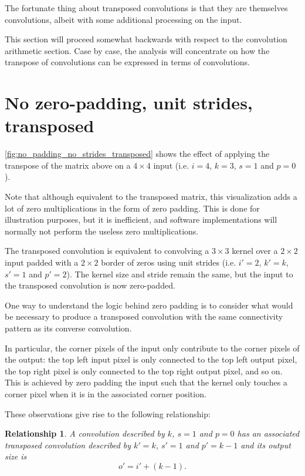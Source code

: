\documentclass{report}
\newtheorem{relationship}{Relationship}
\begin{document}
The fortunate thing about transposed convolutions is that they are themselves
convolutions, albeit with some additional processing on the input.

This section will proceed somewhat backwards with respect to the convolution
arithmetic section. Case by case, the analysis will concentrate on how the
transpose of convolutions can be expressed in terms of convolutions.

\section{No zero-padding, unit strides, transposed}

\autoref{fig:no_padding_no_strides_transposed} shows the effect of applying the
transpose of the matrix above on a $4 \times 4$ input (i.e. $i = 4$, $k = 3$, $s
= 1$ and $p = 0$).

Note that although equivalent to the transposed matrix, this visualization adds
a lot of zero multiplications in the form of zero padding. This is done for
illustration purposes, but it is inefficient, and software implementations will
normally not perform the useless zero multiplications.

The transposed convolution is equivalent to convolving a $3 \times 3$ kernel
over a $2 \times 2$ input padded with a $2 \times 2$ border of zeros using unit
strides (i.e. $i' = 2$, $k' = k$, $s' = 1$ and $p' = 2$). The kernel size and
stride remain the same, but the input to the transposed convolution is now
zero-padded.

One way to understand the logic behind zero padding is to consider what would be
necessary to produce a transposed convolution with the same connectivity pattern
as its converse convolution.

In particular, the corner pixels of the input only contribute to the corner
pixels of the output: the top left input pixel is only connected to the top left
output pixel, the top right pixel is only connected to the top right output
pixel, and so on. This is achieved by zero padding the input such that the
kernel only touches a corner pixel when it is in the associated corner position.

These observations give rise to the following relationship:

\begin{relationship}\label{rel:no_padding_no_strides_transposed}
A convolution described by $k$, $s = 1$ and $p = 0$ has an associated transposed
convolution described by $k' = k$, $s' = 1$ and $p' = k - 1$ and its output size
is
\begin{equation*}
    o' = i' + (k - 1).
\end{equation*}
\end{relationship}
\end{document}
